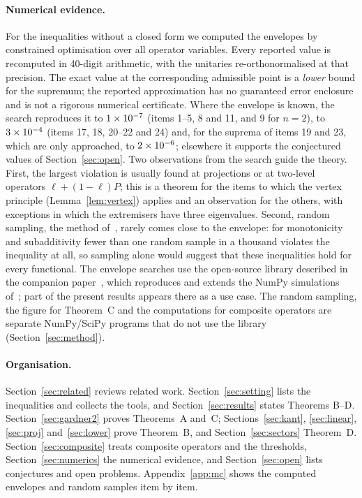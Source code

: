 \documentclass[11pt]{article}
\theoremstyle{plain}
\theoremstyle{definition}
\theoremstyle{remark}
\begin{document}
\paragraph{Numerical evidence.} For the inequalities without a closed form we computed the envelopes by constrained
optimisation over all operator variables. Every reported value is recomputed in 40-digit arithmetic, with the
unitaries re-orthonormalised at that precision. The exact value at the corresponding admissible point is a
\emph{lower} bound for the supremum; the reported approximation has no guaranteed error enclosure and is not a
rigorous numerical certificate. Where the
envelope is known, the search reproduces it to $1\times10^{-7}$ (items 1--5, 8 and 11, and 9 for $n=2$), to $3\times10^{-4}$
(items 17, 18, 20--22 and 24) and, for the suprema of items 19 and 23, which are only approached, to
$2\times10^{-6}$; elsewhere it supports the conjectured values of Section~\ref{sec:open}. Two observations from the search guide the theory. First, the largest violation is usually found
at projections or at two-level operators $\ell+(1-\ell)P$; this is a theorem for the items to which the vertex principle
(Lemma~\ref{lem:vertex}) applies and an observation for the others, with exceptions in which the extremisers have three
eigenvalues. Second, random sampling, the method of~\cite{abed2024}, rarely comes close to the envelope: for
monotonicity and subadditivity fewer than one random sample in a thousand violates the inequality at all, so sampling
alone would suggest that these inequalities hold for every functional. The envelope searches use the open-source library
described in the companion paper~\cite{lib}, which reproduces and extends the NumPy simulations of~\cite{abed2024};
part of the present results appears there as a use case. The random sampling, the figure for Theorem~C and the
computations for composite operators are separate NumPy/SciPy programs that do not use the library
(Section~\ref{sec:method}).

\paragraph{Organisation.} Section~\ref{sec:related} reviews related work. Section~\ref{sec:setting} lists the
inequalities and collects the tools, and Section~\ref{sec:results} states Theorems B--D. Section~\ref{sec:gardner2}
proves Theorems~A and~C; Sections~\ref{sec:kant}, \ref{sec:linear}, \ref{sec:proj} and~\ref{sec:lower} prove Theorem~B,
and Section~\ref{sec:sectors} Theorem~D. Section~\ref{sec:composite} treats composite operators and the thresholds,
Section~\ref{sec:numerics} the numerical evidence, and Section~\ref{sec:open} lists conjectures and open problems.
Appendix~\ref{app:mc} shows the computed envelopes and random samples item by item.
\end{document}
